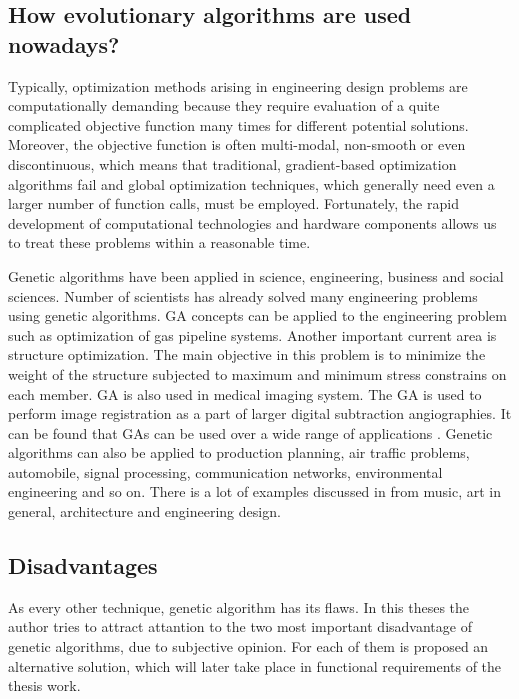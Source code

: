 \subsection{How evolutionary algorithms are used nowadays?}

Typically, optimization methods arising in engineering design problems are computationally demanding because they require evaluation of a quite complicated objective function many times for different potential solutions. Moreover, the objective function is often multi-modal, non-smooth or even discontinuous, which means that traditional, gradient-based optimization algorithms fail and global optimization techniques, which generally need even a larger number of function calls, must be employed. Fortunately, the rapid development of computational technologies and hardware components allows us to treat these problems within a reasonable time.

Genetic algorithms have been applied in science, engineering, business and social sciences. Number of scientists has already solved many engineering problems using genetic algorithms. GA concepts can be applied to the engineering problem such as optimization of gas pipeline systems. Another important current area is structure optimization. The main objective in this problem is to minimize the weight of the structure subjected to maximum and minimum stress constrains on each member. GA is also used in medical imaging system. The GA is used to perform image registration as a part of larger digital subtraction angiographies. It can be found that GAs can be used over a wide range of applications \cite{introduction_to_ga}. Genetic algorithms can also be applied to production planning, air traffic problems, automobile, signal processing, communication networks, environmental engineering and so on. There is a lot of examples discussed in \cite{creative_ga} from music, art in general, architecture and engineering design.

\subsection{Disadvantages}
As every other technique, genetic algorithm has its flaws. In this theses the author tries to attract attantion to the two most important disadvantage of genetic algorithms, due to subjective opinion. For each of them is proposed an alternative solution, which will later take place in functional requirements of the thesis work.

